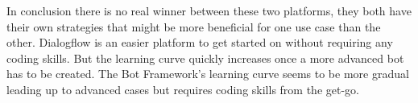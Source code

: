 In conclusion there is no real winner between these two platforms, they both have their own strategies that might be more beneficial for one use case than the other. Dialogflow is an easier platform to get started on without requiring any coding skills. But the learning curve quickly increases once a more advanced bot has to be created. The Bot Framework's learning curve seems to be more gradual leading up to advanced cases but requires coding skills from the get-go.